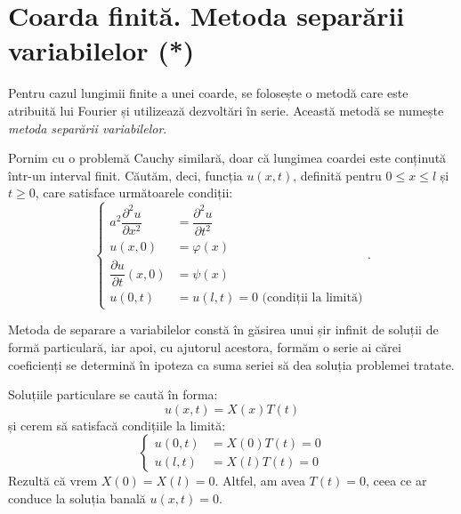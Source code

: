 
\section{Coarda finită. Metoda separării variabilelor (*)}

Pentru cazul lungimii finite a unei coarde, se folosește o metodă care este
atribuită lui Fourier și utilizează dezvoltări în serie. Această metodă se
numește \emph{metoda separării variabilelor}.

Pornim cu o problemă Cauchy similară, doar că lungimea coardei este conținută
într-un interval finit. Căutăm, deci, funcția $ u(x, t) $, definită pentru
$ 0 \leq x \leq l $ și $ t \geq 0 $, care satisface următoarele condiții:
\[
  \begin{cases}
    a^2 \dfrac{\partial^2 u}{\partial x^2} &= \dfrac{\partial^2 u}{\partial t^2} \\
    u(x, 0) &= \varphi(x) \\
    \dfrac{\partial u}{\partial t}(x, 0) &= \psi(x) \\
    u(0, t) &= u(l, t) = 0 \text{ (condiții la limită)}
  \end{cases}.
\]

Metoda de separare a variabilelor constă în găsirea unui șir infinit de soluții
de formă particulară, iar apoi, cu ajutorul acestora, formăm o serie ai cărei
coeficienți se determină în ipoteza ca suma seriei să dea soluția problemei tratate.

Soluțiile particulare se caută în forma:
\[
  u(x, t) = X(x)T(t)
\]
și cerem să satisfacă condițiile la limită:
\[
  \begin{cases}
    u(0, t) &= X(0)T(t) = 0 \\
    u(l, t) &= X(l)T(t) = 0
  \end{cases}
\]
Rezultă că vrem $ X(0) = X(l) = 0 $. Altfel, am avea $ T(t) = 0 $, ceea ce ar conduce la
soluția banală $ u(x, t) = 0 $.

